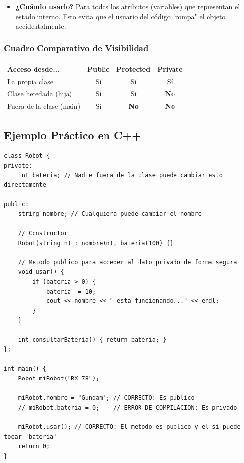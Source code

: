 \documentclass{article}
\begin{document}
    \begin{itemize}
        \item \textbf{¿Cuándo usarlo?} Para todos los atributos
        (variables) que representan el estado interno. Esto evita que
        el usuario del código "rompa" el objeto accidentalmente.
    \end{itemize}

    \subsubsection*{Cuadro Comparativo de Visibilidad}

    \begin{center}
    \begin{tabular}{lccc}
    \toprule
    \textbf{Acceso desde...} & \textbf{Public} & \textbf{Protected} & \textbf{Private} \\
    \midrule
    La propia clase & Sí & Sí & Sí \\
    Clase heredada (hija) & Sí & Sí & \textbf{No} \\
    Fuera de la clase (main) & Sí & \textbf{No} & \textbf{No} \\
    \bottomrule
    \end{tabular}
    \end{center}

    \subsection*{Ejemplo Práctico en C++}

    \begin{lstlisting}
class Robot {
private:
    int bateria; // Nadie fuera de la clase puede cambiar esto directamente

public:
    string nombre; // Cualquiera puede cambiar el nombre

    // Constructor
    Robot(string n) : nombre(n), bateria(100) {}

    // Metodo publico para acceder al dato privado de forma segura
    void usar() {
        if (bateria > 0) {
            bateria -= 10;
            cout << nombre << " esta funcionando..." << endl;
        }
    }

    int consultarBateria() { return bateria; }
};

int main() {
    Robot miRobot("RX-78");

    miRobot.nombre = "Gundam"; // CORRECTO: Es publico
    // miRobot.bateria = 0;    // ERROR DE COMPILACION: Es privado

    miRobot.usar(); // CORRECTO: El metodo es publico y el si puede tocar 'bateria'
    return 0;
}
    \end{lstlisting}
\end{document}
